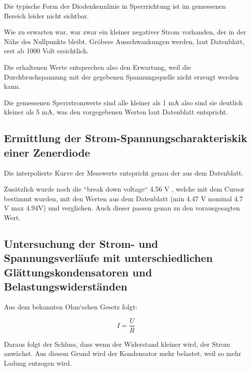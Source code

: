 \documentclass[11pt,ngerman]{scrartcl}
\begin{document}
Die typische Form der Diodenkennlinie in Sperrrichtung ist im gemessenen Bereich leider nicht sichtbar.

Wie zu erwarten war, war zwar ein kleiner negativer Strom vorhanden, der in der
Nähe des Nullpunkts bleibt. Gröbere Ausschwankungen werden, laut Datenblatt,
erst ab 1000 Volt ersichtlich. \cite{1n4007}

\vspace{2mm}

Die erhaltenen Werte entsprechen also den Erwartung, weil die
Durchbruchspannung mit der gegebenen Spannungsquelle nicht erzeugt werden kann.

Die gemessenen Sperrstromwerte sind alle kleiner als 1 mA also sind sie
deutlich kleiner als 5 mA, was den vorgegebenen Werten laut Datenblatt
entspricht. \cite{1n4007}



\subsection{Ermittlung der Strom-Spannungscharakteriskik einer Zenerdiode}

Die interpolierte Kurve der Messwerte entspricht genau der aus dem Datenblatt. \cite{1n5337}

\vspace{2mm}

Zusätzlich wurde noch die ``break down voltage`` 4.56 V , welche mit dem Cursor bestimmt wurden,
mit den Werten aus dem Datenblatt (min 4.47 V nominal 4.7 V max 4.94V)\cite{1n5337}
und verglichen. Auch dieser passen genau zu den vorausgesagten Wert.


\subsection{Untersuchung der Strom- und Spannungsverläufe mit unterschiedlichen Glättungskondensatoren und Belastungswiderständen}

Aus dem bekannten Ohm`schen Gesetz folgt:

\begin{equation}
	I = \frac{U}{R}
\end{equation}

Daraus folgt der Schluss, dass wenn der Widerstand kleiner wird, der Strom anwächst. Aus diesem Grund wird der Kondensator mehr belastet, weil so mehr Ladung entzogen wird.

\vspace{2mm}
\end{document}

